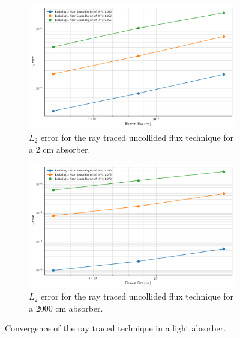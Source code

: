 \begin{figure}[H]
    \centering
    \begin{subfigure}[b]{\textwidth}
        \centering
        \includegraphics[width=\textwidth]{images/verification/rt_anal/shield_point_source_convergence_2.png}
        \caption{$L_{2}$ error for the ray traced uncollided flux technique for a 2 cm absorber.}
        \label{fig:verification:rt:shield:2}
    \end{subfigure}
    \hfill
    \begin{subfigure}[b]{\textwidth}
        \centering
        \includegraphics[width=\textwidth]{images/verification/rt_anal/shield_point_source_convergence_2000.png}
        \caption{$L_{2}$ error for the ray traced uncollided flux technique for a 2000 cm absorber.}
        \label{fig:verification:rt:shield:2000}
    \end{subfigure}
    \caption{Convergence of the ray traced technique in a light absorber.}
    \label{fig:verification:rt:shield}
\end{figure}

